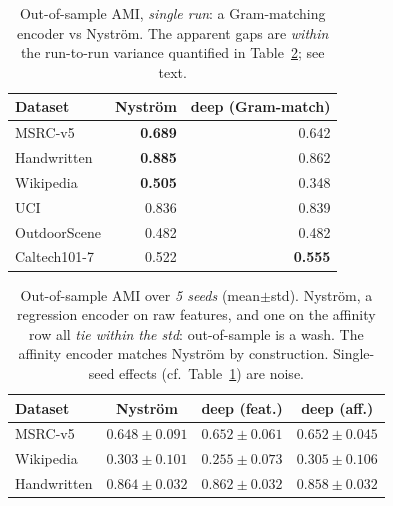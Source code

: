 \documentclass[10pt,twocolumn]{article}
\begin{document}
\begin{table}[t]\centering\footnotesize
\caption{Out-of-sample AMI, \emph{single run}: a Gram-matching encoder vs Nystr\"om. The apparent gaps
are \emph{within} the run-to-run variance quantified in Table~\ref{tab:oos2}; see text.}
\label{tab:oos}
\begin{tabular}{l r r}
\toprule
Dataset & Nystr\"om & deep (Gram-match)\\
\midrule
MSRC-v5       & \textbf{0.689} & 0.642\\
Handwritten   & \textbf{0.885} & 0.862\\
Wikipedia     & \textbf{0.505} & 0.348\\
UCI           & 0.836 & 0.839\\
OutdoorScene  & 0.482 & 0.482\\
Caltech101-7  & 0.522 & \textbf{0.555}\\
\bottomrule
\end{tabular}
\end{table}

\begin{table}[t]\centering\footnotesize
\caption{Out-of-sample AMI over \emph{5 seeds} (mean$\pm$std). Nystr\"om, a regression encoder on raw
features, and one on the affinity row all \emph{tie within the std}: out-of-sample is a wash. The
affinity encoder matches Nystr\"om by construction. Single-seed effects (cf.\ Table~\ref{tab:oos}) are
noise.}
\label{tab:oos2}
\begin{tabular}{l c c c}
\toprule
Dataset & Nystr\"om & deep (feat.) & deep (aff.)\\
\midrule
MSRC-v5     & $0.648\!\pm\!0.091$ & $0.652\!\pm\!0.061$ & $0.652\!\pm\!0.045$\\
Wikipedia   & $0.303\!\pm\!0.101$ & $0.255\!\pm\!0.073$ & $0.305\!\pm\!0.106$\\
Handwritten & $0.864\!\pm\!0.032$ & $0.862\!\pm\!0.032$ & $0.858\!\pm\!0.032$\\
\bottomrule
\end{tabular}
\end{table}
\end{document}
